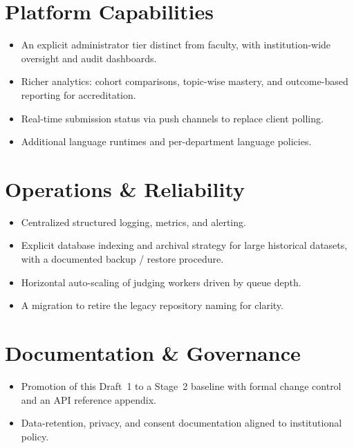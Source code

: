 \documentclass[12pt,a4paper,oneside]{report}
\begin{document}
\section{Platform Capabilities}
\begin{itemize}[leftmargin=1.5em]
  \item An explicit administrator tier distinct from faculty, with
        institution-wide oversight and audit dashboards.
  \item Richer analytics: cohort comparisons, topic-wise mastery, and
        outcome-based reporting for accreditation.
  \item Real-time submission status via push channels to replace client polling.
  \item Additional language runtimes and per-department language policies.
\end{itemize}

\section{Operations \& Reliability}
\begin{itemize}[leftmargin=1.5em]
  \item Centralized structured logging, metrics, and alerting.
  \item Explicit database indexing and archival strategy for large historical
        datasets, with a documented backup / restore procedure.
  \item Horizontal auto-scaling of judging workers driven by queue depth.
  \item A migration to retire the legacy repository naming for clarity.
\end{itemize}

\section{Documentation \& Governance}
\begin{itemize}[leftmargin=1.5em]
  \item Promotion of this Draft~1 to a Stage~2 baseline with formal change
        control and an API reference appendix.
  \item Data-retention, privacy, and consent documentation aligned to
        institutional policy.
\end{itemize}
\end{document}
